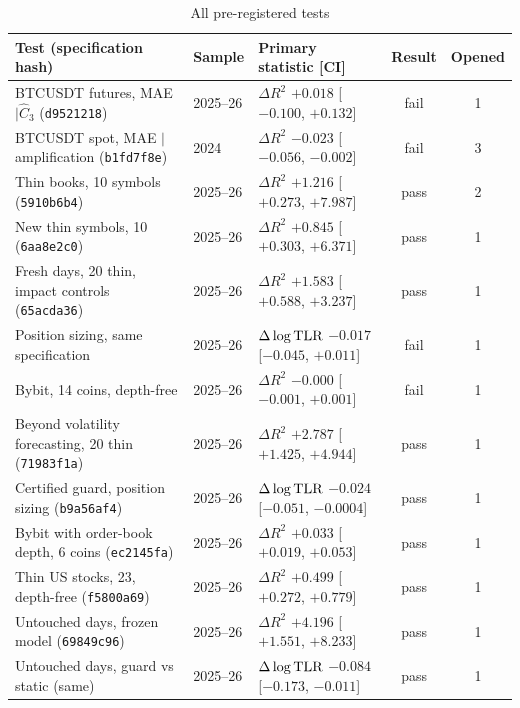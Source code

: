 \begin{table}[!htbp]\centering\footnotesize\renewcommand{\arraystretch}{0.80}\setlength{\abovecaptionskip}{3pt}
\begin{threeparttable}
\caption{All pre-registered tests}\label{tab:alltests}
\setlength{\tabcolsep}{3pt}
\begin{tabular}{p{}lp{}cc}
\toprule
Test (specification hash) & Sample & Primary statistic [CI] & Result & Opened\\
\midrule
BTCUSDT futures, MAE $\mid\hat C_3$ (\texttt{d9521218}) & 2025--26 & $\Delta R^2$ $+0.018$ [$-0.100$, $+0.132$] & fail & 1\\
BTCUSDT spot, MAE $\mid$ amplification (\texttt{b1fd7f8e}) & 2024 & $\Delta R^2$ $-0.023$ [$-0.056$, $-0.002$] & fail & 3\\
Thin books, 10 symbols (\texttt{5910b6b4}) & 2025--26 & $\Delta R^2$ $+1.216$ [$+0.273$, $+7.987$] & pass & 2\\
New thin symbols, 10 (\texttt{6aa8e2c0}) & 2025--26 & $\Delta R^2$ $+0.845$ [$+0.303$, $+6.371$] & pass & 1\\
Fresh days, 20 thin, impact controls (\texttt{65acda36}) & 2025--26 & $\Delta R^2$ $+1.583$ [$+0.588$, $+3.237$] & pass & 1\\
Position sizing, same specification & 2025--26 & $\Delta\log{\rm TLR}$ $-0.017$ [$-0.045$, $+0.011$] & fail & 1\\
Bybit, 14 coins, depth-free & 2025--26 & $\Delta R^2$ $-0.000$ [$-0.001$, $+0.001$] & fail & 1\\
Beyond volatility forecasting, 20 thin (\texttt{71983f1a}) & 2025--26 & $\Delta R^2$ $+2.787$ [$+1.425$, $+4.944$] & pass & 1\\
Certified guard, position sizing (\texttt{b9a56af4}) & 2025--26 & $\Delta\log{\rm TLR}$ $-0.024$ [$-0.051$, $-0.0004$] & pass & 1\\
Bybit with order-book depth, 6 coins (\texttt{ec2145fa}) & 2025--26 & $\Delta R^2$ $+0.033$ [$+0.019$, $+0.053$] & pass & 1\\
Thin US stocks, 23, depth-free (\texttt{f5800a69}) & 2025--26 & $\Delta R^2$ $+0.499$ [$+0.272$, $+0.779$] & pass & 1\\
Untouched days, frozen model (\texttt{69849c96}) & 2025--26 & $\Delta R^2$ $+4.196$ [$+1.551$, $+8.233$] & pass & 1\\
Untouched days, guard vs static (same) & 2025--26 & $\Delta\log{\rm TLR}$ $-0.084$ [$-0.173$, $-0.011$] & pass & 1\\

\end{tabular}
\end{threeparttable}
\end{table}
